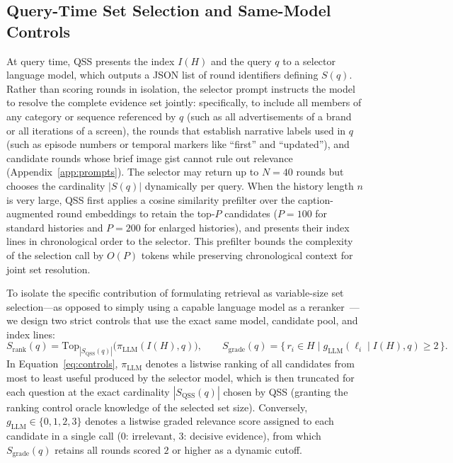 \documentclass[10pt]{article}
\newcommand{\qss}{QSS}
\begin{document}
\subsection{Query-Time Set Selection and Same-Model Controls}
\label{sec:qss}

At query time, \qss{} presents the index $I(H)$ and the query $q$ to a selector language model, which outputs a JSON list of round identifiers defining $S(q)$. Rather than scoring rounds in isolation, the selector prompt instructs the model to resolve the complete evidence set jointly: specifically, to include all members of any category or sequence referenced by $q$ (such as all advertisements of a brand or all iterations of a screen), the rounds that establish narrative labels used in $q$ (such as episode numbers or temporal markers like ``first'' and ``updated''), and candidate rounds whose brief image gist cannot rule out relevance (Appendix~\ref{app:prompts}). The selector may return up to $N{=}40$ rounds but chooses the cardinality $|S(q)|$ dynamically per query. When the history length $n$ is very large, \qss{} first applies a cosine similarity prefilter over the caption-augmented round embeddings to retain the top-$P$ candidates ($P{=}100$ for standard histories and $P{=}200$ for enlarged histories), and presents their index lines in chronological order to the selector. This prefilter bounds the complexity of the selection call by $O(P)$ tokens while preserving chronological context for joint set resolution.

To isolate the specific contribution of formulating retrieval as variable-size set selection—as opposed to simply using a capable language model as a reranker~\citep{sun2023rankgpt,zhuang2024beyond}—we design two strict controls that use the exact same model, candidate pool, and index lines:
\begin{equation}
S_{\mathrm{rank}}(q) = \mathrm{Top}_{|S_{\mathrm{QSS}}(q)|}\big(\pi_{\mathrm{LLM}}(I(H), q)\big), \qquad
S_{\mathrm{grade}}(q) = \big\{\, r_i \in H \;\big|\; g_{\mathrm{LLM}}(\ell_i \mid I(H), q) \ge 2 \,\big\}.
\label{eq:controls}
\end{equation}
In Equation~\eqref{eq:controls}, $\pi_{\mathrm{LLM}}$ denotes a listwise ranking of all candidates from most to least useful produced by the selector model, which is then truncated for each question at the exact cardinality $|S_{\mathrm{QSS}}(q)|$ chosen by \qss{} (granting the ranking control oracle knowledge of the selected set size). Conversely, $g_{\mathrm{LLM}} \in \{0, 1, 2, 3\}$ denotes a listwise graded relevance score assigned to each candidate in a single call ($0$: irrelevant, $3$: decisive evidence), from which $S_{\mathrm{grade}}(q)$ retains all rounds scored $2$ or higher as a dynamic cutoff.
\end{document}
